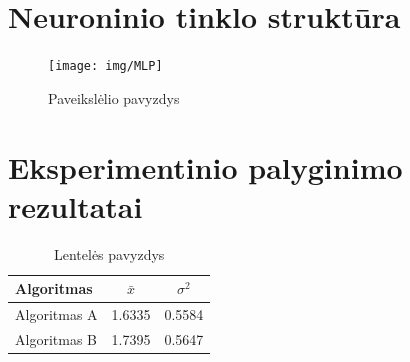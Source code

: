 \documentclass{VUMIFPSkursinis}
\begin{document}
\printbibliography[heading=bibintoc,category=cited] %


\appendix  %

\section{Neuroninio tinklo struktūra}
\begin{figure}[H]
    \centering
    \texttt{[image: img/MLP]}
    \caption{Paveikslėlio pavyzdys}
    \label{img:mlp}
\end{figure}


\section{Eksperimentinio palyginimo rezultatai}
\begin{table}[H]\footnotesize
  \centering
  \caption{Lentelės pavyzdys}
  {\begin{tabular}{|l|c|c|} \hline
    Algoritmas & $\bar{x}$ & $\sigma^{2}$ \\
    \hline
    Algoritmas A  & 1.6335    & 0.5584       \\
    Algoritmas B  & 1.7395    & 0.5647       \\
    \hline
  \end{tabular}}
  \label{tab:table example}
\end{table}
\end{document}
